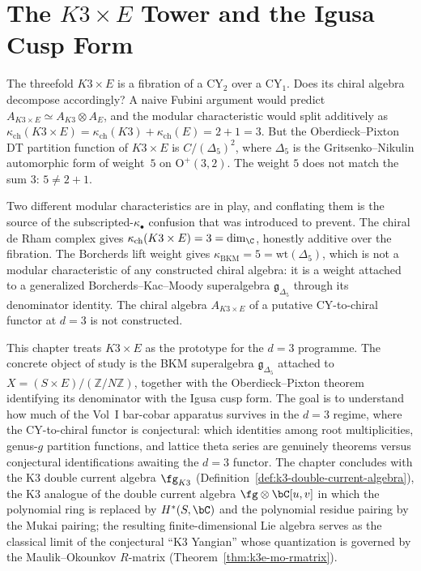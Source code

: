 \chapter{The $K3 \times E$ Tower and the Igusa Cusp Form}
\label{ch:k3-times-e}

The threefold $K3 \times E$ is a fibration of a CY$_2$ over a CY$_1$. Does its chiral algebra decompose accordingly? A naive Fubini argument would predict $A_{K3 \times E} \simeq A_{K3} \otimes A_E$, and the modular characteristic would split additively as $\kappa_{\mathrm{ch}}(K3 \times E) = \kappa_{\mathrm{ch}}(K3) + \kappa_{\mathrm{ch}}(E) = 2 + 1 = 3$. But the Oberdieck--Pixton DT partition function of $K3 \times E$ is $C / (\Delta_5)^2$, where $\Delta_5$ is the Gritsenko--Nikulin automorphic form of weight~$5$ on $\mathrm{O}^+(3,2)$. The weight $5$ does not match the sum $3$: $5 \neq 2 + 1$.

Two different modular characteristics are in play, and conflating them is the source of the subscripted-$\kappa_{\bullet}$ confusion that was introduced to prevent. The chiral de Rham complex gives $\kappa_{\mathrm{ch}}(K3 \times E) = 3 = \dim_\C$, honestly additive over the fibration. The Borcherds lift weight gives $\kappa_{\mathrm{BKM}} = 5 = \mathrm{wt}(\Delta_5)$, which is not a modular characteristic of any constructed chiral algebra: it is a weight attached to a generalized Borcherds--Kac--Moody superalgebra $\mathfrak{g}_{\Delta_5}$ through its denominator identity. The chiral algebra $A_{K3 \times E}$ of a putative CY-to-chiral functor at $d = 3$ is not constructed.

This chapter treats $K3 \times E$ as the prototype for the $d = 3$ programme. The concrete object of study is the BKM superalgebra $\mathfrak{g}_{\Delta_5}$ attached to $X = (S \times E)/(\mathbb{Z}/N\mathbb{Z})$, together with the Oberdieck--Pixton theorem identifying its denominator with the Igusa cusp form. The goal is to understand how much of the Vol~I bar-cobar apparatus survives in the $d = 3$ regime, where the CY-to-chiral functor is conjectural: which identities among root multiplicities, genus-$g$ partition functions, and lattice theta series are genuinely theorems versus conjectural identifications awaiting the $d = 3$ functor. The chapter concludes with the K3 double current algebra $\fg_{K3}$ (Definition~\ref{def:k3-double-current-algebra}), the K3 analogue of the double current algebra $\fg \otimes \bC[u,v]$ in which the polynomial ring is replaced by $H^*(S,\bC)$ and the polynomial residue pairing by the Mukai pairing; the resulting finite-dimensional Lie algebra serves as the classical limit of the conjectural ``K3 Yangian'' whose quantization is governed by the Maulik--Okounkov $R$-matrix (Theorem~\ref{thm:k3e-mo-rmatrix}).

